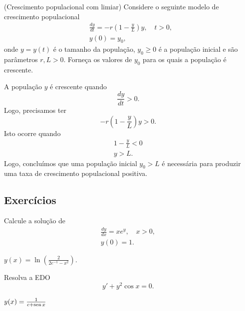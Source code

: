 \begin{exeresol}(Crescimento populacional com limiar)
  Considere o seguinte modelo de crescimento populacional
  \begin{align*}
    &\frac{dy}{dt} = -r\left(1 - \frac{y}{L}\right)y,\quad t>0,\\
    &y(0) = y_0,
  \end{align*}
  onde $y = y(t)$ é o tamanho da população, $y_0 \geq 0$ é a população inicial e são parâmetros $r, L > 0$. Forneça os valores de $y_0$ para os quais a população é crescente.
\end{exeresol}
\begin{resol}
  A população $y$ é crescente quando
  \begin{equation}
    \frac{dy}{dt} > 0.
  \end{equation}
  Logo, precisamos ter
  \begin{equation}
    -r\left(1 - \frac{y}{L}\right)y > 0.
  \end{equation}
  Isto ocorre quando
  \begin{gather}
    1 - \frac{y}{L} < 0 \\
    y > L.
  \end{gather}
  Logo, concluímos que uma população inicial $y_0 > L$ é necessária para produzir uma taxa de crescimento populacional positiva.
\end{resol}

\subsection*{Exercícios}

\begin{exer}
  Calcule a solução de
  \begin{align}
    \frac{dy}{dx} = xe^y,\quad x>0,\\
    y(0) = 1.
  \end{align}
\end{exer}
\begin{resp}
  $y(x) = \ln\left(\frac{2}{2e^{-1}-x^2}\right)$.
\end{resp}

\begin{exer}
  Resolva a EDO
  \begin{equation}
    y' + y^2\cos x = 0.
  \end{equation}
\end{exer}
\begin{resp}
  $y(x) = \frac{1}{c + \operatorname{sen} x}$
\end{resp}

